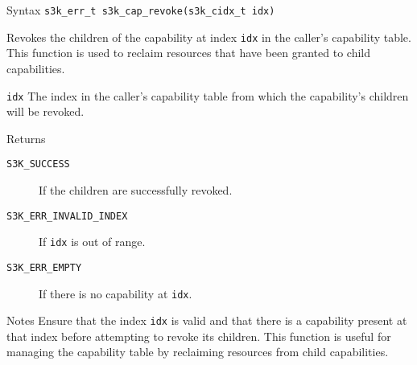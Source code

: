 \documentclass[a4paper,11pt]{article}
\newenvironment{syscalldoc}[1]{
  \begin{tcolorbox}[breakable,title=\subsection{\texttt{#1()}}]
  \begin{description}[leftmargin=!,style=nextline,noitemsep]
}{
  \end{description}
  \end{tcolorbox}
}
\begin{document}
\begin{syscalldoc}{s3k\_cap\_revoke}
  \item[Syntax] \lstinline{s3k_err_t s3k_cap_revoke(s3k_cidx_t idx)}

  \item[Description] Revokes the children of the capability at index \verb|idx| in the caller's capability table. This function is used to reclaim resources that have been granted to child capabilities.

  \item[Parameters]
    \begin{description}
      \item[]
      \item[\texttt{idx}] The index in the caller's capability table from which the capability's children will be revoked.
    \end{description}

  \item[Returns]
    \begin{description}
      \item[]
      \item[\texttt{S3K\_SUCCESS}] If the children are successfully revoked.
      \item[\texttt{S3K\_ERR\_INVALID\_INDEX}] If \verb|idx| is out of range.
      \item[\texttt{S3K\_ERR\_EMPTY}] If there is no capability at \verb|idx|.
    \end{description}

  \item[Notes] Ensure that the index \verb|idx| is valid and that there is a capability present at that index before attempting to revoke its children. This function is useful for managing the capability table by reclaiming resources from child capabilities.
\end{syscalldoc}
\end{document}
